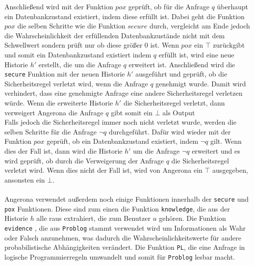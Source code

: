 \documentclass[german,version-2020-11]{uzl-thesis}
\begin{document}
Anschließend wird mit der Funktion $pox$ geprüft, ob für die  Anfrage $q$ überhaupt ein Datenbankzustand existiert, indem diese erfüllt ist. Dabei geht die Funktion $pox$ die selben Schritte wie die Funktion $secure$ durch, vergleicht am Ende jedoch die Wahrscheinlichkeit der erfüllenden Datenbankzustände nicht mit dem Schwellwert sondern prüft nur ob diese größer 0 ist. Wenn $pox$ ein $\top$ zurückgibt und somit ein Datenbankzustand existiert indem $q$ erfüllt ist, wird eine neue Historie $h'$ erstellt, die um die Anfrage $q$ erweitert ist. Anschließend wird die \texttt{secure} Funktion mit der neuen Historie $h'$ ausgeführt und geprüft, ob die Sicherheitsregel verletzt wird, wenn die Anfrage $q$ genehmigt wurde. Damit wird verhindert, dass eine genehmigte Anfrage eine andere Sicherheitsregel verletzen würde. Wenn die erweiterte Historie $h'$ die Sicherheitsregel verletzt, dann verweigert Angerona die Anfrage $q$ gibt somit ein $\bot$ als Output \\ 
Falls jedoch die Sicherheitsregel immer noch nicht verletzt wurde, werden die selben Schritte für die Anfrage $\neg q$ durchgeführt. Dafür wird wieder mit der Funktion $pox$ geprüft,  ob ein Datenbankzustand existiert, indem $ \neg q$ gilt. Wenn dies der Fall ist, dann wird die Historie $h'$ um die Anfrage $\neg q$ erweitert und es wird geprüft, ob durch die Verweigerung der Anfrage $q$ die Sicherheitsregel verletzt wird. Wenn dies nicht der Fall ist, wird von Angerona ein $\top$ ausgegeben, ansonsten ein $\bot$. \\ \\ 
Angerona verwendet außerdem noch einige Funktionen innerhalb der \texttt{secure} und \texttt{pox} Funktionen. Diese sind zum einen die Funktion \texttt{knowledge}, die aus der Historie $h$ alle raus extrahiert, die zum Benutzer $u$ gehören. Die Funktion \texttt{evidence} , die aus \texttt{Problog} stammt verwendet wird um Informationen als Wahr oder Falsch anzunehmen, was dadurch die Wahrscheinlichkeitswerte für andere probabilistische Abhängigkeiten verändert. Die Funktion \texttt{PL}, die  eine Anfrage in logische Programmierregeln umwandelt und somit für \texttt{Problog} lesbar macht. \cite{guarnieri2017securing}
\end{document}
